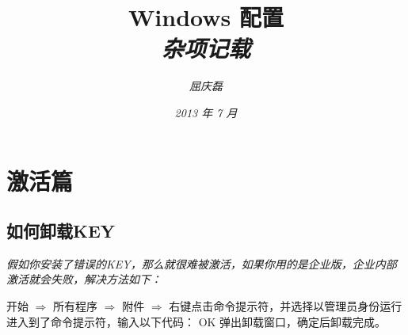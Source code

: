\documentclass{article}
\begin{document}
\title{%
  {\huge \textsf{Windows 配置}\\\smallskip}%
  {\small \textit{杂项记载}}
}

\author{\textit{屈庆磊}\\[2mm]
       }

\date{\textit{2013 年 7 月}}

\maketitle
\begin{multicols}{2}
\tableofcontents
\end{multicols}

\section{激活篇}
\subsection{如何卸载KEY}
\textit{
假如你安装了错误的KEY，那么就很难被激活，如果你用的是企业版，企业内部激活就会失败，解决方法如下：
}

开始 $\Rightarrow$ 所有程序 $\Rightarrow$ 附件 $\Rightarrow$ 右键点击命令提示符，并选择以管理员身份运行
进入到了命令提示符，输入以下代码： OK 弹出卸载窗口，确定后卸载完成。
\end{document}
